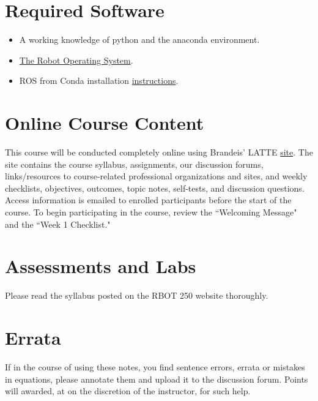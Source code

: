 \section{Required Software}
	
	\begin{itemize}
	\item A working knowledge of python and the anaconda environment.
	\item \href{https://www.ros.org/}{The Robot Operating System}.
	\item ROS from Conda installation \href{ https://medium.com/@wolfv/ros-on-conda-forge-dca6827ac4b6}{instructions}.
	\end{itemize}

\section{Online Course Content}
%
This course will be conducted completely online using Brandeis’ LATTE \href{http://moodle2.brandeis.edu}{site}. The site contains the course syllabus, assignments, our discussion forums, links/resources to course-related professional organizations and sites, and weekly checklists, objectives, outcomes, topic notes, self-tests, and discussion questions.  Access information is emailed to enrolled participants before the start of the course.   To begin participating in the course, review the ``Welcoming Message" and the ``Week 1 Checklist."

\section{Assessments and Labs}

Please read the syllabus posted on the RBOT 250 website thoroughly.

\section{Errata}

If in the course of using these notes, you find sentence errors, errata or mistakes in equations, please annotate them and upload it to the discussion forum. Points will awarded, at on the discretion of the instructor, for such help.